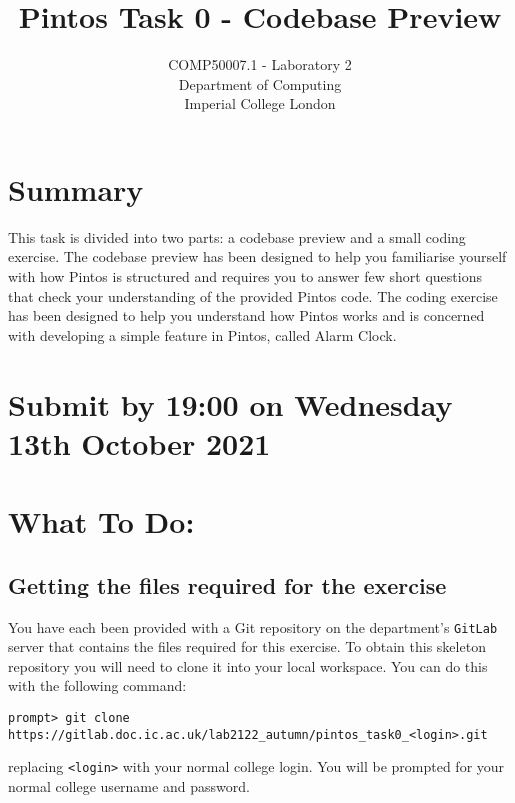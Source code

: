 \documentclass[a4paper,12pt]{article}
\newcommand{\shell}[1]{\lstinline!#1!}
\begin{document}

\title{Pintos Task 0 - Codebase Preview}
\date{}

\author{
COMP50007.1 - Laboratory 2 \\ 
Department of Computing \\ 
Imperial College London
}

\maketitle

\section*{Summary}
This task is divided into two parts: a codebase preview and a small coding exercise.
The codebase preview has been designed to help you familiarise yourself with how Pintos is structured 
and requires you to answer few short questions that check your understanding of the provided Pintos code.
The coding exercise has been designed to help you understand how Pintos works 
and is concerned with developing a simple feature in Pintos, called Alarm Clock.

\section*{Submit by 19:00 on Wednesday 13th October 2021}

\section*{What To Do:}

\subsection*{Getting the files required for the exercise}

You have each been provided with a Git repository on the department's \shell{GitLab} server that contains the files required for this exercise.
To obtain this skeleton repository you will need to clone it into your local workspace.
You can do this with the following command:
%
\begin{lstlisting}
prompt> git clone https://gitlab.doc.ic.ac.uk/lab2122_autumn/pintos_task0_<login>.git
\end{lstlisting}
%
replacing \shell{<login>} with your normal college login.
You will be prompted for your normal college username and password.
\end{document}
